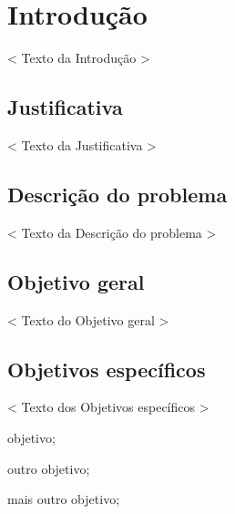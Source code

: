 \chapter{Introdução}
    
    < Texto da Introdução >
    
    \section{Justificativa}
        
        < Texto da Justificativa >
        
    \section{Descrição do problema}
        
        < Texto da Descrição do problema >
        
    
    \section{Objetivo geral}
    
        < Texto do Objetivo geral >
    
    \section{Objetivos específicos}
    
        < Texto dos Objetivos específicos > 
    
        \begin{alineas}
            
            \item objetivo;
            
            \item outro objetivo;
            
            \item mais outro objetivo;
            
        \end{alineas}
